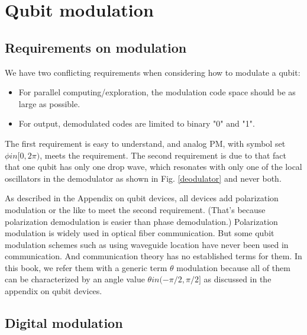 \documentclass{book}
\begin{document}
\section{Qubit modulation}
\subsection{Requirements on modulation}
We have two conflicting requirements when considering how to modulate a qubit:
\begin{itemize}
    \item For parallel computing/exploration, the modulation code space should be as large as possible.
    \item For output, demodulated codes are limited to binary "0" and "1".
\end{itemize}

The first requirement is easy to understand, and analog PM, with symbol set $\phi in [0, 2\pi)$, meets the requirement. The second requirement is due to that fact that one qubit has only one drop wave, which resonates with only one of the local oscillators in the demodulator as shown in Fig. \ref{deodulator} and never both.

As described in the Appendix on qubit devices, all devices add polarization modulation or the like to meet the second requirement. (That's because polarization demodulation is easier than phase demodulation.) Polarization modulation is widely used in optical fiber communication. But some qubit modulation schemes such as using waveguide location have never been used in communication. And communication theory has no established terms for them. In this book, we refer them with a generic term $\theta$ modulation because all of them can be characterized by an angle value $\theta in (-\pi/2, \pi/2]$ as discussed in the appendix on qubit devices.

\subsection{Digital modulation}
\end{document}

